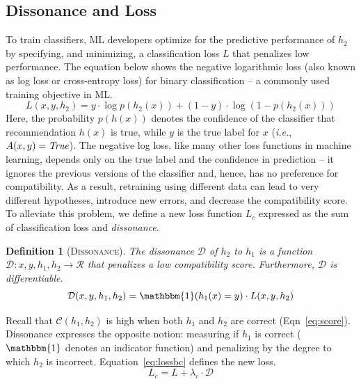 \documentclass[letterpaper]{article}
\newtheorem*{definition}{Definition}
\newcommand{\hone}{\mbox{$h_1$}}
\newcommand{\htwo}{\mbox{$h_2$}}
\newcommand{\compatscore}{\mathcal{C}}
\newcommand{\loss}{L}
\newcommand{\lossbc}{\loss_c}
\newcommand{\lambdabc}{\lambda_c}
\newcommand{\dissonance}{\mathcal{D}}
\newcommand{\ie}{\mbox{\it i.e.}}
\begin{document}
\subsection{Dissonance and Loss}
To train classifiers, ML developers optimize for the predictive performance of $\htwo$
by specifying, and minimizing, a classification loss $\loss$ that penalizes low performance. The equation below shows the negative logarithmic loss (also known as log loss or cross-entropy loss) for binary classification -- a commonly used training objective in ML. 
\begin{equation*}
    \label{eq:logloss}
    \loss(x, y, \htwo) = y \cdot \log p(\htwo(x)) + (1 - y) \cdot \log (1 - p(\htwo(x)))
\end{equation*}
Here, the probability $p(h(x))$ denotes the confidence of the classifier that recommendation $h(x)$ is true, while $y$ is the true label for $x$ (\ie, $A(x, y) = \mbox{\em True}$).
The negative log loss, like many other loss functions in machine learning, depends only on the true label and the confidence in prediction -- it ignores the previous versions of the classifier and, hence, has no preference for compatibility. As a result, retraining using different data can lead to very different hypotheses, introduce new errors, and decrease the compatibility score. 
To alleviate this problem, we define a new loss function $\lossbc$ expressed as the sum of classification loss and {\em dissonance}.

\begin{definition}[\textsc{Dissonance}]
The dissonance $\dissonance$ of $\htwo$ to $\hone$ is a function $\dissonance: x, y, \hone, \htwo \rightarrow \mathcal{R}$ that penalizes a low compatibility score. Furthermore, $\dissonance$ is differentiable.
\begin{equation}
    \label{eq:diss}
    \dissonance(x, y, \hone, \htwo) = \mathbbm{1}(\hone(x) = y) \cdot \loss(x, y, \htwo)
\end{equation}
\end{definition}

\noindent Recall that  $\compatscore(\hone, \htwo)$ is high when both $\hone$ and $\htwo$ are correct (Eqn~\ref{eq:score}).  Dissonance  expresses the opposite notion: measuring if $\hone$ is correct ($\mathbbm{1}$ denotes an indicator function)
and penalizing by the degree to which $\htwo$ is incorrect.
Equation~\ref{eq:lossbc} defines the new loss.
\begin{equation}
    \label{eq:lossbc}
    \lossbc = \loss + \lambdabc \cdot \dissonance
\end{equation}
\end{document}

